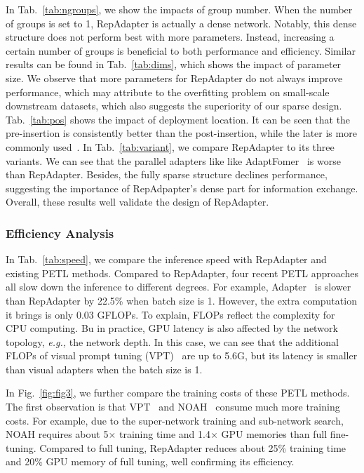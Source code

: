  In Tab.~\ref{tab:ngroups}, we show the impacts of  group number.  When the number of groups is set to 1, RepAdapter is  actually  a  dense network.  Notably, this dense structure does not perform best with more parameters. Instead, increasing a certain number of groups is beneficial to  both performance and efficiency.  Similar results can be found in Tab.~\ref{tab:dims}, which shows the impact of parameter size.  We observe that more parameters for RepAdapter do not always improve   performance, which may attribute to the overfitting problem on  small-scale  downstream datasets, which also suggests  the superiority of our  sparse design. 
  Tab.~\ref{tab:pos} shows  the  impact of deployment location.   It can be seen that the pre-insertion  is consistently better than the post-insertion,  while the later is more commonly used~\cite{adapter,vladapter}. In Tab.~\ref{tab:variant}, we compare RepAdapter to its three variants.   We  can see that   the parallel adapters like like AdaptFomer~\cite{adaptformer} is   worse than   RepAdapter.   Besides, the fully sparse structure   declines performance,  suggesting the importance of RepAdpapter's dense  part for information exchange. Overall, these results well validate the design of RepAdapter.

 \subsubsection{Efficiency Analysis} In Tab.~\ref{tab:speed}, we compare the inference  speed  with RepAdapter and existing PETL methods.  Compared to RepAdapter,  four recent PETL approaches  all slow down the inference  to different degrees. For example, Adapter~\cite{adapter} is slower than RepAdapter by 22.5\% when batch size is 1.  However, the extra computation it brings is  only 0.03 GFLOPs. To explain,  FLOPs reflect the complexity for CPU computing.  Bu in practice,  GPU latency is  also affected by the network topology, \emph{e.g.,} the network depth.   In this case, we can see  that the additional FLOPs of  visual prompt tuning (VPT)~\cite{vpt}    are  up to 5.6G, but its latency is smaller than visual adapters when the batch size is 1.   


In Fig.~\ref{fig:fig3}, we further compare the training costs of  these PETL methods.  The first observation is that VPT~\cite{vpt} and NOAH~\cite{noah} consume much more training costs. For example, due to  the super-network training and     sub-network  search, NOAH requires about 5$\times$ training time and 1.4$\times$ GPU memories than   full fine-tuning.  Compared to  full tuning, RepAdapter    reduces about 25\% training time and 20\% GPU memory  of full tuning, well confirming its  efficiency.

